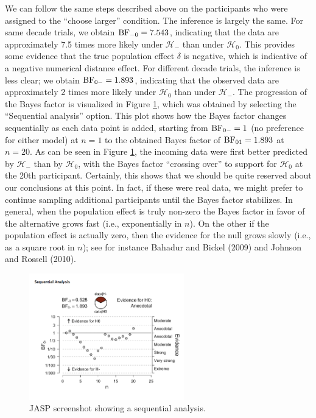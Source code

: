 \documentclass[english,,doc,floatsintext]{apa6}
\begin{document}
We can follow the same steps described above on the participants who were assigned to the ``choose larger'' condition. The inference is largely the same. For same decade trials, we obtain \(\textnormal{BF}_{-0}=7.543\), indicating that the data are approximately 7.5 times more likely under \(\mathcal{H}_{-}\) than under \(\mathcal{H}_{0}\). This provides some evidence that the true population effect \(\delta\) is negative, which is indicative of a negative numerical distance effect. For different decade trials, the inference is less clear; we obtain \(\textnormal{BF}_{0-}=1.893\), indicating that the observed data are approximately 2 times more likely under \(\mathcal{H}_{0}\) than under \(\mathcal{H}_{-}\). The progression of the Bayes factor is visualized in Figure \ref{fig:ttestSequential}, which was obtained by selecting the ``Sequential analysis'' option. This plot shows how the Bayes factor changes sequentially as each data point is added, starting from \(\textnormal{BF}_{0-}=1\) (no preference for either model) at \(n=1\) to the obtained Bayes factor of \(\textnormal{BF}_{01}=1.893\) at \(n=20\). As can be seen in Figure \ref{fig:ttestSequential}, the incoming data were first better predicted by \(\mathcal{H}_{-}\) than by \(\mathcal{H}_{0}\), with the Bayes factor ``crossing over'' to support for \(\mathcal{H}_{0}\) at the 20th participant. Certainly, this shows that we should be quite reserved about our conclusions at this point. In fact, if these were real data, we might prefer to continue sampling additional participants until the Bayes factor stabilizes. In general, when the population effect is truly non-zero the Bayes factor in favor of the alternative grows fast (i.e., exponentially in \(n\)). On the other if the population effect is actually zero, then the evidence for the null grows slowly (i.e., as a square root in \(n\)); see for instance Bahadur and Bickel (2009) and Johnson and Rossell (2010).

\begin{figure}
\centering
\includegraphics[width=0.6\textwidth,height=\textheight]{figures/ttestSequential.png}
\caption{\label{fig:ttestSequential}JASP screenshot showing a sequential analysis.}
\end{figure}
\end{document}
